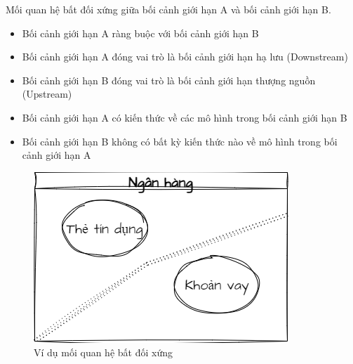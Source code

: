 \begin{example} Mối quan hệ bất đối xứng giữa      bối cảnh giới hạn A và     bối cảnh giới hạn B.
    \begin{itemize}
        \item      Bối cảnh giới hạn  A ràng buộc với      bối cảnh giới hạn  B

        \item      Bối cảnh giới hạn  A đóng vai trò là bối cảnh giới hạn hạ lưu (Downstream)

        \item      Bối cảnh giới hạn  B đóng vai trò là bối cảnh giới hạn thượng nguồn (Upstream)

        \item      Bối cảnh giới hạn    A có kiến thức về các mô hình trong bối cảnh giới hạn B

        \item      Bối cảnh giới hạn  B không có bất kỳ kiến thức nào về mô hình trong bối cảnh giới hạn A
    \end{itemize}

    \begin{figure}[H]

        \centering

        \includegraphics[scale = 0.5]{pictures/mo_hinh_rieng_biet_separate_ways/main.drawio.png}

        \caption{Ví dụ  mối quan hệ bất đối xứng }

    \end{figure}
\end{example}






